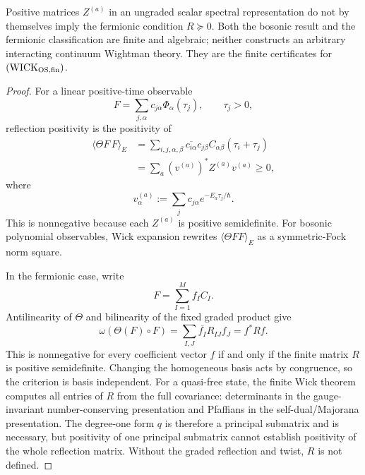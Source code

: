 \documentclass[12pt,a4paper]{article}
\begin{document}
\begin{theorem}
Positive matrices \(Z^{(a)}\) in an ungraded scalar spectral representation
do not by themselves imply the fermionic condition \(R\succeq0\).  Both the
bosonic result and the fermionic classification are finite and algebraic;
neither constructs an arbitrary interacting continuum Wightman theory.
They are the finite certificates for
\((\mathrm{WICK}_{\rm OS,fin})\).
\end{theorem}


\begin{proof}
For a linear positive-time observable
\[
F=\sum_{j,\alpha}c_{j\alpha}\Phi_\alpha(\tau_j),
\qquad \tau_j>0,
\]
reflection positivity is the positivity of
\begin{align}
\langle \Theta F\,F\rangle_E
&=
\sum_{i,j,\alpha,\beta}
\overline{c_{i\alpha}}c_{j\beta}
C_{\alpha\beta}(\tau_i+\tau_j) \\
&=
\sum_a (v^{(a)})^*Z^{(a)}v^{(a)}
\ge0,
\end{align}
where
\[
v^{(a)}_\alpha
:=
\sum_j c_{j\alpha}e^{-E_a\tau_j/\hbar}.
\]
This is nonnegative because each \(Z^{(a)}\) is positive semidefinite.  For bosonic
polynomial observables, Wick expansion rewrites
\(\langle\Theta F F\rangle_E\) as a symmetric-Fock norm square.

In the fermionic case, write
\[
F=\sum_{I=1}^M f_I C_I.
\]
Antilinearity of \(\Theta\) and bilinearity of the fixed graded product give
\[
\omega\!\left(\Theta(F)\circ F\right)
=
\sum_{I,J}\overline{f_I}R_{IJ}f_J
=f^*Rf.
\]
This is nonnegative for every coefficient vector \(f\) if and only if the
finite matrix \(R\) is positive semidefinite.  Changing the homogeneous basis
acts by congruence, so the criterion is basis independent.  For a quasi-free
state, the finite Wick theorem computes all entries of \(R\) from the full
covariance: determinants in the gauge-invariant number-conserving
presentation and Pfaffians in the self-dual/Majorana presentation.  The
degree-one form \(q\) is therefore a principal submatrix and is necessary,
but positivity of one principal submatrix cannot establish positivity of the
whole reflection matrix.  Without the graded reflection and twist, \(R\) is
not defined.
\end{proof}
\end{document}
